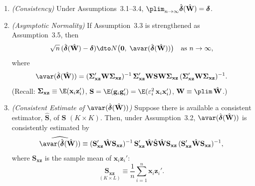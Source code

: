 \begin{proposition}
\label{prop:3.1}
\begin{enumerate}[label=(\alph*)]
\item \emph{(Consistency)} Under Assumptions~3.1--3.4,
  $\plim_{n\to\infty} \hat{\boldsymbol{\delta}}(\hat{\mathbf{W}}) = \boldsymbol{\delta}$.

\item \emph{(Asymptotic Normality)} If Assumption~3.3 is strengthened as
  Assumption~3.5, then
  \[
    \sqrt{n}\,(\hat{\boldsymbol{\delta}}(\hat{\mathbf{W}}) - \boldsymbol{\delta})
    \dto N\bigl(\mathbf{0},\; \avar(\hat{\boldsymbol{\delta}}(\hat{\mathbf{W}}))\bigr)
    \quad \text{as } n \to \infty,
  \]
  where
  \begin{equation}
    \avar(\hat{\boldsymbol{\delta}}(\hat{\mathbf{W}}))
    = (\boldsymbol{\Sigma}_{\mathbf{xz}}' \mathbf{W} \boldsymbol{\Sigma}_{\mathbf{xz}})^{-1}\,
      \boldsymbol{\Sigma}_{\mathbf{xz}}' \mathbf{W} \mathbf{S} \mathbf{W}
      \boldsymbol{\Sigma}_{\mathbf{xz}}\,
      (\boldsymbol{\Sigma}_{\mathbf{xz}}' \mathbf{W} \boldsymbol{\Sigma}_{\mathbf{xz}})^{-1}.
    \label{eq:3.5.1}
  \end{equation}
  (Recall: $\boldsymbol{\Sigma}_{\mathbf{xz}} \equiv \E(\mathbf{x}_i \mathbf{z}_i')$,
  $\mathbf{S} = \E(\mathbf{g}_i \mathbf{g}_i') = \E(\varepsilon_i^2\, \mathbf{x}_i \mathbf{x}_i')$,
  $\mathbf{W} \equiv \plim\, \hat{\mathbf{W}}$.)

\item \emph{(Consistent Estimate of $\avar(\hat{\boldsymbol{\delta}}(\hat{\mathbf{W}}))$)}
  Suppose there is available a consistent estimator, $\hat{\mathbf{S}}$, of $\mathbf{S}$
  $(K \times K)$.  Then, under Assumption~3.2,
  $\avar(\hat{\boldsymbol{\delta}}(\hat{\mathbf{W}}))$ is consistently estimated by
  \begin{equation}
    \widehat{\avar(\hat{\boldsymbol{\delta}}(\hat{\mathbf{W}}))}
    \equiv (\mathbf{S}_{\mathbf{xz}}' \hat{\mathbf{W}} \mathbf{S}_{\mathbf{xz}})^{-1}\,
      \mathbf{S}_{\mathbf{xz}}' \hat{\mathbf{W}} \hat{\mathbf{S}} \hat{\mathbf{W}}
      \mathbf{S}_{\mathbf{xz}}\,
      (\mathbf{S}_{\mathbf{xz}}' \hat{\mathbf{W}} \mathbf{S}_{\mathbf{xz}})^{-1},
    \label{eq:3.5.2}
  \end{equation}
  where $\mathbf{S}_{\mathbf{xz}}$ is the sample mean of $\mathbf{x}_i \mathbf{z}_i'$:
  \[
    \underset{(K \times L)}{\mathbf{S}_{\mathbf{xz}}}
    \equiv \frac{1}{n} \sum_{i=1}^{n} \mathbf{x}_i \mathbf{z}_i'.
  \]
\end{enumerate}
\end{proposition}


